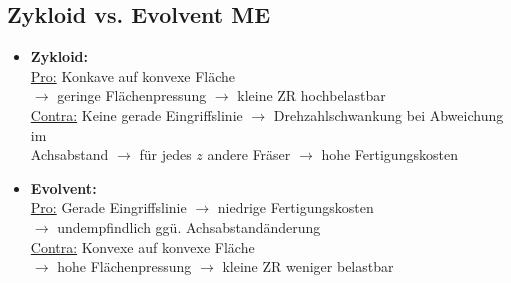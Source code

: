 \subsection{Zykloid vs. Evolvent \hfill ME}
    \begin{scriptsize}
    \begin{itemize}
        \item \textbf{Zykloid:}
        \\\underline{Pro:} Konkave auf konvexe Fläche \\$\to$ geringe Flächenpressung $\to$ kleine ZR hochbelastbar
        \\\underline{Contra:} Keine gerade Eingriffslinie $\to$ Drehzahlschwankung bei Abweichung im \\Achsabstand $\to$ für jedes $z$ andere Fräser $\to$ hohe Fertigungskosten
        \item \textbf{Evolvent:}
        \\\underline{Pro:} Gerade Eingriffslinie $\to$ niedrige Fertigungskosten \\$\to$ undempfindlich ggü. Achsabstandänderung
        \\\underline{Contra:} Konvexe auf konvexe Fläche \\$\to$ hohe Flächenpressung $\to$ kleine ZR weniger belastbar
    \end{itemize}
\end{scriptsize}